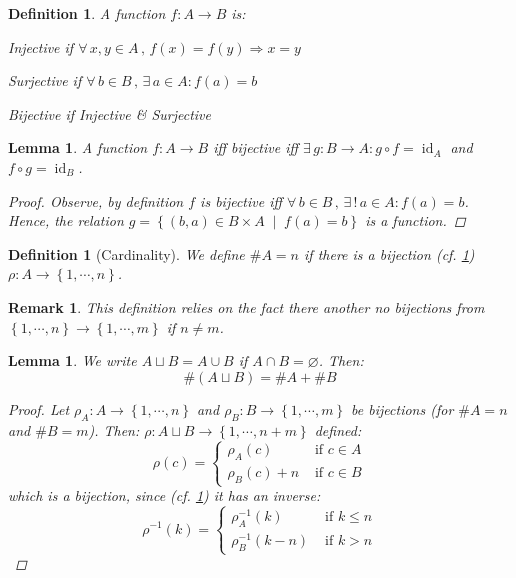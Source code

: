 \documentclass[12pt]{article}
\let\emptyset\varnothing
\let\RA\Rightarrow
\newcommand{\set}[2]{\left\{{#1}\;\middle|\;{#2}\right\}}
\newcommand{\Forall}[1]{\forall\,{#1}\,,\,}
\newcommand{\Exist}[1]{\exists\,{#1}:}
\newcommand{\seq}[2][0]{\left\{{#1},\cdots,{#2}\right\}}
\DeclareMathOperator{\id}{id}
\newtheorem{definition}[theorem]{Definition}
\newtheorem{lemma}[theorem]{Lemma}
\newtheorem{remark}[theorem]{Remark}
\begin{document}
\begin{definition}
  \label{fn_defs}
  A function $f:A\to B$ is:
  \begin{compactitem}
    \item Injective if $\Forall{x,y\in A}f(x)=f(y)\RA x=y$
    \item Surjective if $\Forall{b\in B}\Exist{a\in A}f(a)=b$
    \item Bijective if Injective \& Surjective
  \end{compactitem}
\end{definition}

\begin{lemma}
  \label{inverses}
  A function $f:A\to B$ iff bijective iff $\Exist{g:B\to A}g\circ f=\id_A$ and $f\circ g=\id_B$.
  \begin{proof}
    Observe, by definition $f$ is bijective iff $\Forall{b\in B}\Exist{!\,a\in A}f(a)=b$. Hence, the relation $g=\set{(b,a)\in B\times A}{f(a)=b}$ is a function.
  \end{proof}
\end{lemma}

\begin{definition}[Cardinality]
  We define $\# A=n$ if there is a bijection (cf. \ref{fn_defs}) $\rho:A\to\seq[1]{n}$.
\end{definition}

\begin{remark}
  This definition relies on the fact there another no bijections from $\seq[1]{n}\to\seq[1]{m}$ if $n\neq m$.
\end{remark}

\begin{lemma}
  \label{addition_rule}
  We write $A\sqcup B=A\cup B$ if $A\cap B=\emptyset$. Then: $$\#(A\sqcup B)=\#A+\#B$$ 
  \begin{proof}
    Let $\rho_A:A\to\seq[1]{n}$ and $\rho_B:B\to\seq[1]{m}$ be bijections (for $\#A=n$ and $\#B=m$). Then: $\rho:A\sqcup B\to\seq[1]{n+m}$ defined: $$\rho(c)=\begin{cases}
      \rho_A(c)&\text{ if }c\in A\\
      \rho_B(c)+n&\text{ if }c\in B
    \end{cases}$$
    which is a bijection, since (cf. \ref{inverses}) it has an inverse: $$\rho^{-1}(k)=\begin{cases}
      \rho_A^{-1}(k)&\text{ if }k\leq n\\
      \rho_B^{-1}(k-n)&\text{ if }k>n
    \end{cases}$$
  \end{proof}
\end{lemma}
\end{document}
